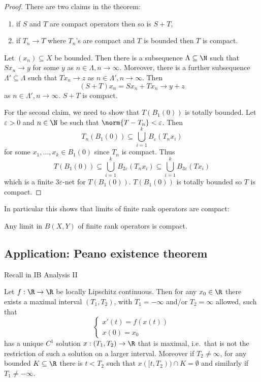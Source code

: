 \documentclass[a4paper]{article}
\begin{document}
\begin{proof}
  There are two claims in the theorem:
  \begin{enumerate}
  \item if \(S\) and \(T\) are compact operators then so is \(S + T\),
  \item if \(T_n \to T\) where \(T_n\)'s are compact and \(T\) is bounded then \(T\) is compact.
  \end{enumerate}

  Let \((x_n) \subseteq X\) be bounded. Then there is a subsequence \(\Lambda \subseteq \N\) such that \(Sx_n \to y\) for some \(y\) as \(n \in \Lambda, n \to \infty\). Moreover, there is a further subsequence \(\Lambda' \subseteq \Lambda\) such that \(Tx_n \to z\) as \(n \in \Lambda', n \to \infty\). Then
  \[
    (S + T) x_n = S x_n + T x_n \to y + z
  \]
  as \(n \in \Lambda', n \to \infty\). \(S + T\) is compact.

  For the second claim, we need to show that \(T(B_1(0))\) is totally bounded. Let \(\varepsilon > 0\) and \(n \in \N\) be such that \(\norm{T - T_n} < \varepsilon\). Then
  \[
    T_n(B_1(0)) \subseteq \bigcup_{i = 1}^k B_\varepsilon (T_nx_i)
  \]
  for some \(x_1, \dots, x_k \in B_1(0)\) since \(T_n\) is compact. Thus
  \[
    T(B_1(0)) \subseteq \bigcup_{i = 1}^k B_{2\varepsilon} (T_n x_i) \subseteq \bigcup_{i = 1}^k B_{3 \varepsilon} (Tx_i)
  \]
  which is a finite \(3\varepsilon\)-net for \(T(B_1(0))\). \(T(B_1(0))\) is totally bounded so \(T\) is compact.
\end{proof}

In particular this shows that limits of finite rank operators are compact:

\begin{corollary}
  Any limit in \(B(X, Y)\) of finite rank operators is compact.
\end{corollary}

\subsection{Application: Peano existence theorem}

Recall in IB Analysis II

\begin{theorem}
  Let \(f: \R \to \R\) be locally Lipschitz continuous. Then for any \(x_0 \in \R\) there exists a maximal interval \((T_1, T_2)\), with \(T_1 = -\infty\) and/or \(T_2 = \infty\) allowed, such that
  \[
    \label{eqn:differential equation}
    \left\{
    \begin{array}{l}
      x'(t) = f(x(t)) \\
      x(0) = x_0
    \end{array}
    \right.
    \tag{\ast}
  \]
  has a unique \(C^1\) solution \(x: (T_1, T_2) \to \R\) that is maximal, i.e.\ that is not the restriction of such a solution on a larger interval. Moreover if \(T_2 \neq \infty\), for any bounded \(K \subseteq \R\) there is \(t < T_2\) such that \(x([t, T_2)) \cap K = \emptyset\) and similarly if \(T_1 \neq -\infty\).
\end{theorem}
\end{document}
